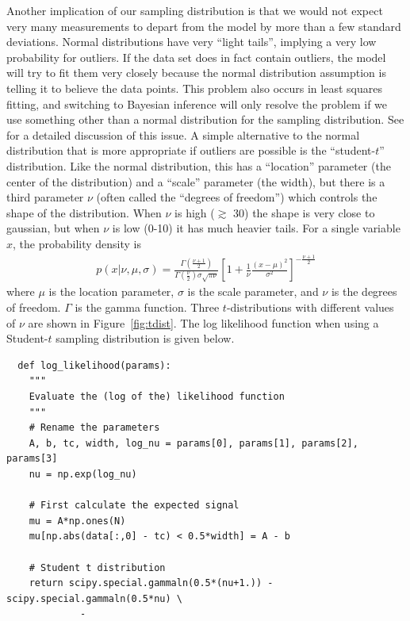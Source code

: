 Another implication of our sampling distribution is that we would not expect
very many measurements to depart from the model by more than a few standard
deviations. Normal distributions have very ``light tails'', implying a very
low probability for outliers. If the data set does in fact contain outliers,
the model will try to fit them very closely because the normal distribution
assumption is telling it to believe the data points. This problem also occurs
in least squares fitting, and switching to Bayesian inference will only resolve
the problem if we use something other than a normal distribution for the
sampling distribution. See \citet{hoggline} for a detailed discussion of this
issue. A simple alternative to the normal distribution that is more appropriate
if outliers are possible is the ``student-$t$'' distribution. Like the normal
distribution, this has a ``location'' parameter (the center of the distribution)
and a ``scale'' parameter (the width), but there is a third parameter $\nu$
(often called the ``degrees of freedom'')
which controls the shape of the distribution. When $\nu$ is high ($\gtrsim$ 30)
the shape is very close to gaussian, but when $\nu$ is low (0-10) it has much
heavier tails. For a single variable $x$, the probability density is
\begin{eqnarray}
p(x|\nu, \mu, \sigma) = \frac{\Gamma\left(\frac{\nu + 1}{2}\right)}
{\Gamma\left(\frac{\nu}{2}\right)\sigma\sqrt{\pi\nu}}
\left[1 + \frac{1}{\nu}\frac{(x - \mu)^2}{\sigma^2}
\right]^{-\frac{\nu + 1}{2}}
\end{eqnarray}
where $\mu$ is the location parameter, $\sigma$ is the scale parameter, and
$\nu$ is the degrees of freedom. $\Gamma$ is the gamma function. Three
$t$-distributions with different values of $\nu$ are shown in
Figure~\ref{fig:tdist}. The log likelihood function when using a Student-$t$
sampling distribution is given below.

\begin{verbatim}
  def log_likelihood(params):
    """
    Evaluate the (log of the) likelihood function
    """
    # Rename the parameters
    A, b, tc, width, log_nu = params[0], params[1], params[2], params[3]
    nu = np.exp(log_nu)

    # First calculate the expected signal
    mu = A*np.ones(N)
    mu[np.abs(data[:,0] - tc) < 0.5*width] = A - b

    # Student t distribution
    return scipy.special.gammaln(0.5*(nu+1.)) - scipy.special.gammaln(0.5*nu) \
             -
\end{verbatim}

